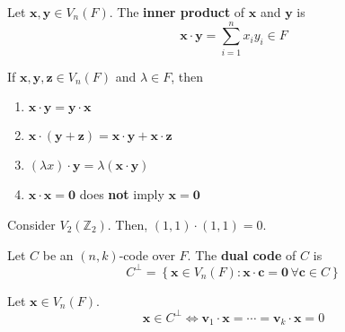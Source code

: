 \begin{defbox}
    \begin{definition}
        Let $ \bm{x},\bm{y}\in V_n(F) $. The \textbf{inner product}
        of $ \bm{x} $ and $ \bm{y} $ is
        \[ \bm{x}\cdot \bm{y}=\sum\limits_{i=1}^{n} x_i y_i\in F \]
    \end{definition} \end{defbox}

\begin{thmbox}
    \begin{theorem}
        If $ \bm{x},\bm{y},\bm{z}\in V_n(F) $ and $ \lambda\in F $, then
        \begin{enumerate}[label=(\arabic*)]
            \item $ \bm{x}\cdot \bm{y}=\bm{y}\cdot \bm{x} $
            \item $ \bm{x}\cdot (\bm{y}+\bm{z})=\bm{x}\cdot \bm{y}+\bm{x}\cdot \bm{z} $
            \item $ (\lambda x)\cdot \bm{y}=\lambda(\bm{x}\cdot \bm{y}) $
            \item $ \bm{x}\cdot \bm{x}=\bm{0}$ does \textbf{not} imply $ \bm{x}=\bm{0} $
        \end{enumerate}
    \end{theorem} \end{thmbox}

\begin{exbox}
    \begin{example}
        Consider $ V_2(\mathbb{Z}_2) $. Then, $ (1,1)\cdot(1,1)=0 $.
    \end{example}
\end{exbox}

\begin{defbox}
    \begin{definition}
        Let $ C $ be an $ (n,k) $-code over $ F $. The \textbf{dual code}
        of $ C $ is
        \[ C^{\perp}=\left\{ \bm{x}\in V_n(F):\bm{x}\cdot \bm{c}=\bm{0}\,\forall \bm{c}\in C\right\} \]
    \end{definition} \end{defbox}

\begin{thmbox}
    \begin{theorem}
        Let $ \bm{x}\in V_n(F) $.
        \[ \bm{x}\in C^{\perp}\iff \bm{v}_1\cdot \bm{x}=\cdots =\bm{v}_k\cdot \bm{x}=0 \]
    \end{theorem} \end{thmbox}

